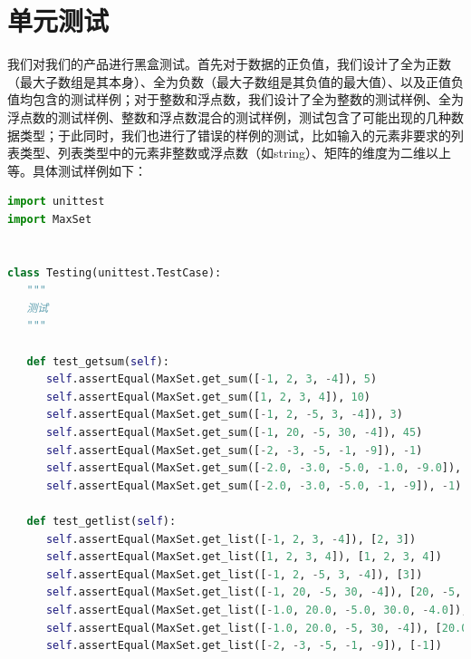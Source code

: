 \documentclass{article}
\begin{document}
\section{单元测试}
我们对我们的产品进行黑盒测试。首先对于数据的正负值，我们设计了全为正数（最大子数组是其本身）、全为负数（最大子数组是其负值的最大值）、以及正值负值均包含的测试样例；对于整数和浮点数，我们设计了全为整数的测试样例、全为浮点数的测试样例、整数和浮点数混合的测试样例，测试包含了可能出现的几种数据类型；于此同时，我们也进行了错误的样例的测试，比如输入的元素非要求的列表类型、列表类型中的元素非整数或浮点数（如string）、矩阵的维度为二维以上等。具体测试样例如下：
\begin{lstlisting}[language = python]
import unittest
import MaxSet


class Testing(unittest.TestCase):
   """
   测试
   """

   def test_getsum(self):
      self.assertEqual(MaxSet.get_sum([-1, 2, 3, -4]), 5)
      self.assertEqual(MaxSet.get_sum([1, 2, 3, 4]), 10)
      self.assertEqual(MaxSet.get_sum([-1, 2, -5, 3, -4]), 3)
      self.assertEqual(MaxSet.get_sum([-1, 20, -5, 30, -4]), 45)
      self.assertEqual(MaxSet.get_sum([-2, -3, -5, -1, -9]), -1)
      self.assertEqual(MaxSet.get_sum([-2.0, -3.0, -5.0, -1.0, -9.0]), -1)
      self.assertEqual(MaxSet.get_sum([-2.0, -3.0, -5.0, -1, -9]), -1)

   def test_getlist(self):
      self.assertEqual(MaxSet.get_list([-1, 2, 3, -4]), [2, 3])
      self.assertEqual(MaxSet.get_list([1, 2, 3, 4]), [1, 2, 3, 4])
      self.assertEqual(MaxSet.get_list([-1, 2, -5, 3, -4]), [3])
      self.assertEqual(MaxSet.get_list([-1, 20, -5, 30, -4]), [20, -5, 30])
      self.assertEqual(MaxSet.get_list([-1.0, 20.0, -5.0, 30.0, -4.0]), [20.0, -5.0, 30.0])
      self.assertEqual(MaxSet.get_list([-1.0, 20.0, -5, 30, -4]), [20.0, -5, 30])
      self.assertEqual(MaxSet.get_list([-2, -3, -5, -1, -9]), [-1])


\end{lstlisting}
\end{document}
